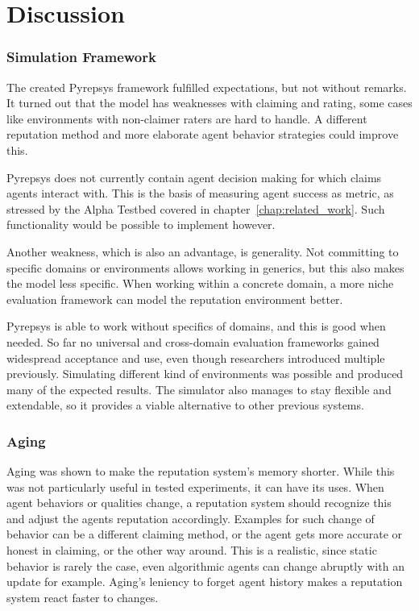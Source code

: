 \documentclass[%
    ]{\PathToTumTemplate/thesis/tum_thesis}
\begin{document}
\section{Discussion}\label{sec:discussion}


\subsubsection{Simulation Framework}
The created Pyrepsys framework fulfilled expectations, but not without remarks.
It turned out that the model has weaknesses with claiming and rating, some cases like environments with non-claimer raters are hard to handle.
A different reputation method and more elaborate agent behavior strategies could improve this.

Pyrepsys does not currently contain agent decision making for which claims agents interact with.
This is the basis of measuring agent success as metric, as stressed by the Alpha Testbed covered in chapter~\ref{chap:related_work}.
Such functionality would be possible to implement however.

Another weakness, which is also an advantage, is generality.
Not committing to specific domains or environments allows working in generics, but this also makes the model less specific.
When working within a concrete domain, a more niche evaluation framework can model the reputation environment better.

Pyrepsys is able to work without specifics of domains, and this is good when needed.
So far no universal and cross-domain evaluation frameworks gained widespread acceptance and use, even though researchers introduced multiple previously.
Simulating different kind of environments was possible and produced many of the expected results.
The simulator also manages to stay flexible and extendable, so it provides a viable alternative to other previous systems.


\subsubsection{Aging}
Aging was shown to make the reputation system's memory shorter.
While this was not particularly useful in tested experiments, it can have its uses.
When agent behaviors or qualities change, a reputation system should recognize this and adjust the agents reputation accordingly.
Examples for such change of behavior can be a different claiming method, or the agent gets more accurate or honest in claiming, or the other way around.
This is a realistic, since static behavior is rarely the case, even algorithmic agents can change abruptly with an update for example.
Aging's leniency to forget agent history makes a reputation system react faster to changes.
\end{document}
